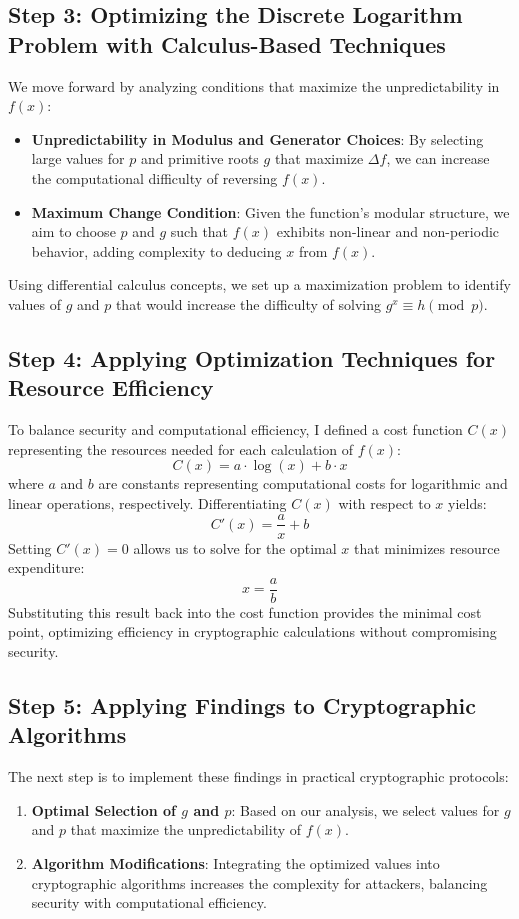 \documentclass[12pt]{article}
\begin{document}
\subsection{Step 3: Optimizing the Discrete Logarithm Problem with Calculus-Based Techniques}
We move forward by analyzing conditions that maximize the unpredictability in \( f(x) \):
\begin{itemize}
    \item \textbf{Unpredictability in Modulus and Generator Choices}: By selecting large values for \( p \) and primitive roots \( g \) that maximize \( \Delta f \), we can increase the computational difficulty of reversing \( f(x) \).
    \item \textbf{Maximum Change Condition}: Given the function’s modular structure, we aim to choose \( p \) and \( g \) such that \( f(x) \) exhibits non-linear and non-periodic behavior, adding complexity to deducing \( x \) from \( f(x) \).
\end{itemize}

Using differential calculus concepts, we set up a maximization problem to identify values of \( g \) and \( p \) that would increase the difficulty of solving \( g^x \equiv h \pmod{p} \).

\subsection{Step 4: Applying Optimization Techniques for Resource Efficiency}
To balance security and computational efficiency, I defined a cost function \( C(x) \) representing the resources needed for each calculation of \( f(x) \):
\[
C(x) = a \cdot \log(x) + b \cdot x
\]
where \( a \) and \( b \) are constants representing computational costs for logarithmic and linear operations, respectively. Differentiating \( C(x) \) with respect to \( x \) yields:
\[
C'(x) = \frac{a}{x} + b
\]
Setting \( C'(x) = 0 \) allows us to solve for the optimal \( x \) that minimizes resource expenditure:
\[
x = \frac{a}{b}
\]
Substituting this result back into the cost function provides the minimal cost point, optimizing efficiency in cryptographic calculations without compromising security.

\subsection{Step 5: Applying Findings to Cryptographic Algorithms}
The next step is to implement these findings in practical cryptographic protocols:
\begin{enumerate}
    \item \textbf{Optimal Selection of \( g \) and \( p \)}: Based on our analysis, we select values for \( g \) and \( p \) that maximize the unpredictability of \( f(x) \).
    \item \textbf{Algorithm Modifications}: Integrating the optimized values into cryptographic algorithms increases the complexity for attackers, balancing security with computational efficiency.
\end{enumerate}
\end{document}
